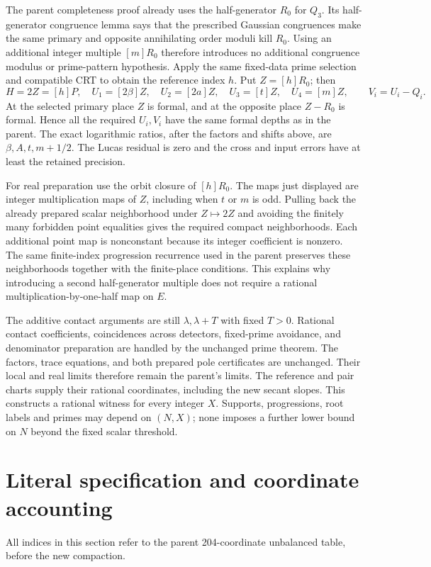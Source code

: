 \documentclass[11pt,a4paper]{article}
\begin{document}
The parent completeness proof already uses the half-generator $R_0$ for
$Q_3$. Its half-generator congruence lemma says that the prescribed
Gaussian congruences make the same primary and opposite annihilating
order moduli kill $R_0$. Using an additional integer multiple $[m]R_0$
therefore introduces no additional congruence modulus or prime-pattern
hypothesis. Apply the same fixed-data prime selection and compatible CRT
to obtain the reference index $h$. Put $Z=[h]R_0$; then
\[
 H=2Z=[h]P,\quad
 U_1=[2\beta]Z,\quad U_2=[2a]Z,\quad U_3=[t]Z,\quad U_4=[m]Z,
 \qquad V_i=U_i-Q_i.
\]
At the selected primary place $Z$ is formal, and at the opposite place
$Z-R_0$ is formal. Hence all the required $U_i,V_i$ have the same
formal depths as in the parent. The exact logarithmic ratios, after
the factors and shifts above, are $\beta,A,t,m+1/2$.
The Lucas residual is zero and the cross and input errors have at least
the retained precision.

For real preparation use the orbit closure of $[h]R_0$. The maps just
displayed are integer multiplication maps of $Z$, including when $t$ or
$m$ is odd. Pulling back the already prepared scalar neighborhood under
$Z\mapsto2Z$ and avoiding the finitely many forbidden point equalities
gives the required compact neighborhoods. Each additional point map is
nonconstant because its integer coefficient is nonzero. The same
finite-index progression recurrence used in the parent preserves these
neighborhoods together with the finite-place conditions. This explains
why introducing a second half-generator multiple does not require a
rational multiplication-by-one-half map on $E$.

The additive contact arguments are still $\lambda,\lambda+T$ with fixed
$T>0$. Rational contact coefficients, coincidences across detectors,
fixed-prime avoidance, and denominator preparation are handled by the
unchanged prime theorem. The factors, trace equations, and both prepared
pole certificates are unchanged. Their local and real limits therefore
remain the parent's limits. The reference and pair charts supply their
rational coordinates, including the new secant slopes. This constructs
a rational witness for every integer $X$. Supports, progressions, root
labels and primes may depend on $(N,X)$; none imposes a further lower
bound on $N$ beyond the fixed scalar threshold.

\section{Literal specification and coordinate accounting}\label{sec:spec}
All indices in this section refer to the parent 204-coordinate unbalanced
table, before the new compaction.
\end{document}
